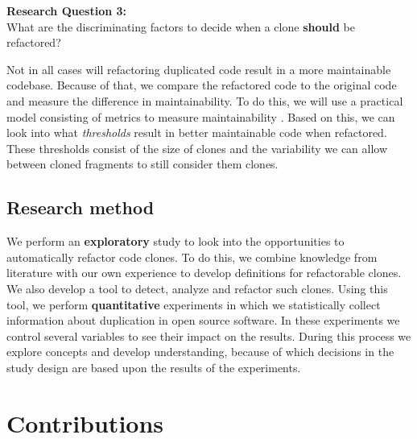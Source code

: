 \begin{displayquote}
\textbf{Research Question 3:}\\What are the discriminating factors to decide when a clone \textbf{should} be refactored?
\end{displayquote}
Not in all cases will refactoring duplicated code result in a more maintainable codebase. Because of that, we compare the refactored code to the original code and measure the difference in maintainability. To do this, we will use a practical model consisting of metrics to measure maintainability \cite{heitlager2007practical}. Based on this, we can look into what \textit{thresholds} result in better maintainable code when refactored. These thresholds consist of the size of clones and the variability we can allow between cloned fragments to still consider them clones.

\subsection{Research method}
We perform an \textbf{exploratory} study to look into the opportunities to automatically refactor code clones. To do this, we combine knowledge from literature with our own experience to develop definitions for refactorable clones. We also develop a tool to detect, analyze and refactor such clones. Using this tool, we perform \textbf{quantitative} experiments in which we statistically collect information about duplication in open source software. In these experiments we control several variables to see their impact on the results. During this process we explore concepts and develop understanding, because of which decisions in the study design are based upon the results of the experiments.

\section{Contributions}

